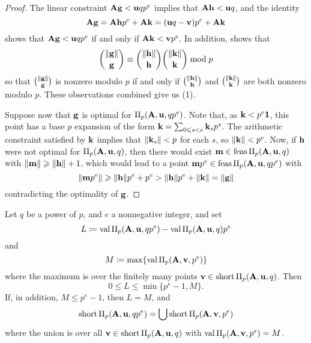 \documentclass{article}
\begin{document}
\begin{proof}
   The linear constraint $\mathbf{A}\mathbf{g} < \mathbf{u}qp^e$  implies that $\mathbf{A}\mathbf{h} < \mathbf{u}q$, and the identity
   \[\mathbf{A} \mathbf{g} = \mathbf{A} \mathbf{h} p^e + \mathbf{A} \mathbf{k} = (\mathbf{u}q-\mathbf{v})p^e + \mathbf{A} \mathbf{k}\]
   shows that $\mathbf{A}\mathbf{g} < \mathbf{u}qp^e$ if and only if  $\mathbf{A} \mathbf{k} < \mathbf{v}p^e$.
   In addition,  shows that
   \[\binom{\| \mathbf{g} \|}{\mathbf{g}} \equiv \binom{\| \mathbf{h} \|}{\mathbf{h}} \binom{\| \mathbf{k} \|}{\mathbf{k}} \bmod p\]
   so that $\binom{\| \mathbf{g} \|}{\mathbf{g}}$ is nonzero modulo $p$ if and only if  $\binom{\| \mathbf{h} \|}{\mathbf{h}}$ and $\binom{\| \mathbf{k} \|}{\mathbf{k}}$ are both nonzero modulo $p$.
   These observations combined give us (1).

   Suppose now that $\mathbf{g}$ is optimal for $\Pi_p(\mathbf{A},\mathbf{u},qp^e)$.
   Note that,  as $\mathbf{k} < p^e\mathbf{1}$, this point has a base $p$ expansion of the form $\mathbf{k} = \sum_{0 \leqslant s< e} \mathbf{k}_s  p^s$.
   The arithmetic constraint satisfied by $\mathbf{k}$ implies that $\| \mathbf{k}_s \| < p$ for each $s$, so $\| \mathbf{k} \| < p^e$.
   Now, if $\mathbf{h}$ were not optimal for $\Pi_p(\mathbf{A}, \mathbf{u}, q)$, then there would exist $\mathbf{m} \in \operatorname{feas}\Pi_p(\mathbf{A}, \mathbf{u}, q)$ with $\| \mathbf{m} \| \geqslant \| \mathbf{h} \| + 1$, which would lead to a point $\mathbf{m}p^e \in \operatorname{feas}\Pi_p(\mathbf{A}, \mathbf{u}, qp^e)$ with
   \[ \| \mathbf{m}p^e \| \geqslant \| \mathbf{h} \|  p^e + p^e >  \| \mathbf{h} \|  p^e + \| \mathbf{k} \| = \| \mathbf{g} \|\]
   contradicting the optimality of $\mathbf{g}$.
\end{proof}

\begin{theorem}
   \label{general AIP: T}
   Let $q$ be a power of $p$, and $e$ a nonnegative integer, and set
\[  L \coloneqq \operatorname{val} \Pi_p(\mathbf{A}, \mathbf{u}, qp^e) -  \operatorname{val} \Pi_p(\mathbf{A}, \mathbf{u}, q)p^e  \]
and
\[ M \coloneqq \max \{ \operatorname{val} \Pi_p(\mathbf{A}, \mathbf{v}, p^e)  \}\]
where the maximum is over the finitely many points $\mathbf{v} \in \operatorname{short} \Pi_p(\mathbf{A}, \mathbf{u}, q)$.
Then
\[0 \le L \le \min\{p^e-1,M\}.\]
If, in addition, $M \le p^e-1$,  then $L=M$, and
\[  \operatorname{short} \Pi_p(\mathbf{A}, \mathbf{u}, qp^e) = \bigcup \operatorname{short} \Pi_p(\mathbf{A}, \mathbf{v}, p^e)\]
where the union is over all $\mathbf{v} \in \operatorname{short} \Pi_p(\mathbf{A}, \mathbf{u}, q)$ with $\operatorname{val} \Pi_p(\mathbf{A},\mathbf{v},p^e) = M$.
\end{theorem}
\end{document}
